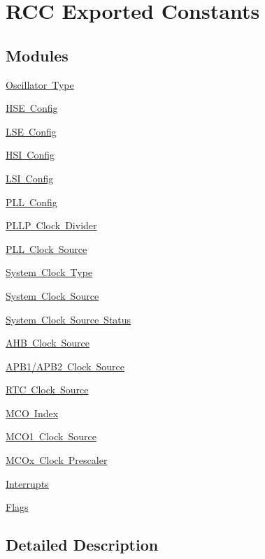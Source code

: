 \hypertarget{group___r_c_c___exported___constants}{}\section{R\+CC Exported Constants}
\label{group___r_c_c___exported___constants}
\subsection*{Modules}
\begin{DoxyCompactItemize}
\item 
\mbox{\hyperlink{group___r_c_c___oscillator___type}{Oscillator Type}}
\item 
\mbox{\hyperlink{group___r_c_c___h_s_e___config}{H\+S\+E Config}}
\item 
\mbox{\hyperlink{group___r_c_c___l_s_e___config}{L\+S\+E Config}}
\item 
\mbox{\hyperlink{group___r_c_c___h_s_i___config}{H\+S\+I Config}}
\item 
\mbox{\hyperlink{group___r_c_c___l_s_i___config}{L\+S\+I Config}}
\item 
\mbox{\hyperlink{group___r_c_c___p_l_l___config}{P\+L\+L Config}}
\item 
\mbox{\hyperlink{group___r_c_c___p_l_l_p___clock___divider}{P\+L\+L\+P Clock Divider}}
\item 
\mbox{\hyperlink{group___r_c_c___p_l_l___clock___source}{P\+L\+L Clock Source}}
\item 
\mbox{\hyperlink{group___r_c_c___system___clock___type}{System Clock Type}}
\item 
\mbox{\hyperlink{group___r_c_c___system___clock___source}{System Clock Source}}
\item 
\mbox{\hyperlink{group___r_c_c___system___clock___source___status}{System Clock Source Status}}
\item 
\mbox{\hyperlink{group___r_c_c___a_h_b___clock___source}{A\+H\+B Clock Source}}
\item 
\mbox{\hyperlink{group___r_c_c___a_p_b1___a_p_b2___clock___source}{A\+P\+B1/\+A\+P\+B2 Clock Source}}
\item 
\mbox{\hyperlink{group___r_c_c___r_t_c___clock___source}{R\+T\+C Clock Source}}
\item 
\mbox{\hyperlink{group___r_c_c___m_c_o___index}{M\+C\+O Index}}
\item 
\mbox{\hyperlink{group___r_c_c___m_c_o1___clock___source}{M\+C\+O1 Clock Source}}
\item 
\mbox{\hyperlink{group___r_c_c___m_c_ox___clock___prescaler}{M\+C\+Ox Clock Prescaler}}
\item 
\mbox{\hyperlink{group___r_c_c___interrupt}{Interrupts}}
\item 
\mbox{\hyperlink{group___r_c_c___flag}{Flags}}
\end{DoxyCompactItemize}


\subsection{Detailed Description}
